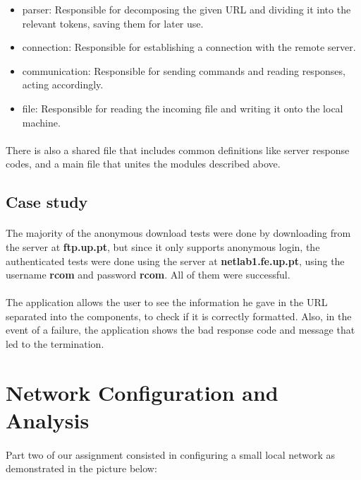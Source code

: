 \documentclass[11pt]{article}
\begin{document}
\begin{itemize}
    \item{parser: Responsible for decomposing the given URL and dividing it into the relevant tokens, saving them for later use.}
    \item{connection: Responsible for establishing a connection with the remote server.}
    \item{communication: Responsible for sending commands and reading responses, acting accordingly.}
    \item{file: Responsible for reading the incoming file and writing it onto the local machine.}
\end{itemize}

\paragraph{}There is also a shared file that includes common definitions like server response codes, and a main file that unites the modules described above.

\subsection*{Case study}

\paragraph{}The majority of the anonymous download tests were done by downloading from the server at \textbf{ftp.up.pt}, but since it only supports anonymous login, the authenticated tests were done using the server at \textbf{netlab1.fe.up.pt}, using the username \textbf{rcom} and password \textbf{rcom}. All of them were successful.

\paragraph{}The application allows the user to see the information he gave in the URL separated into the components, to check if it is correctly formatted. Also, in the event of a failure, the application shows the bad response code and message that led to the termination.

\section*{Network Configuration and Analysis}
\paragraph{}Part two of our assignment consisted in configuring a small local network as demonstrated in the picture below:
\end{document}
